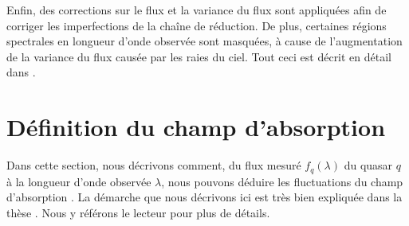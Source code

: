 \documentclass[11pt, twoside, a4paper, openright]{report}
\begin{document}
Enfin, des corrections sur le flux et la variance du flux sont appliquées afin de corriger les imperfections de la chaîne de réduction. De plus, certaines régions spectrales en longueur d'onde observée sont masquées, à cause de l'augmentation de la variance du flux causée par les raies du ciel. Tout ceci est décrit en détail dans \citet{CITE:dr16}.

\section{Définition du champ d'absorption}
Dans cette section, nous décrivons comment, du flux mesuré $f_q(\lambda)$ du quasar $q$ à la longueur d'onde observée $\lambda$, nous pouvons déduire les fluctuations du champ d'absorption \lya{}.
La démarche que nous décrivons ici est très bien expliquée dans la thèse \citet{CITE:Victoria}. Nous y référons le lecteur pour plus de détails.
\end{document}
